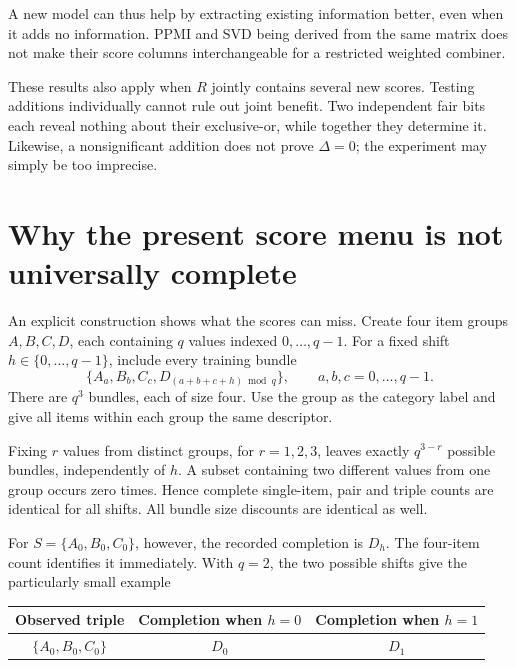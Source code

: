 \documentclass[11pt,a4paper]{article}
\begin{document}
A new model can thus help by extracting existing information better, even
when it adds no information. PPMI and SVD being derived from the same
matrix does not make their score columns interchangeable for a restricted
weighted combiner.

These results also apply when $R$ jointly contains several new scores.
Testing additions individually cannot rule out joint benefit. Two independent
fair bits each reveal nothing about their exclusive-or, while together they
determine it. Likewise, a nonsignificant addition does not prove
$\Delta=0$; the experiment may simply be too imprecise.

\section{Why the present score menu is not universally complete}
\label{sec:counterexample}

An explicit construction shows what the scores can miss. Create four item
groups $A,B,C,D$, each containing $q$ values indexed $0,\ldots,q-1$. For
a fixed shift $h\in\{0,\ldots,q-1\}$, include every training bundle
\begin{equation}
 \{A_a,B_b,C_c,D_{(a+b+c+h)\bmod q}\},
 \qquad a,b,c=0,\ldots,q-1.
 \label{eq:corpus}
\end{equation}
There are $q^3$ bundles, each of size four. Use the group as the category
label and give all items within each group the same descriptor.

Fixing $r$ values from distinct groups, for $r=1,2,3$, leaves exactly
$q^{3-r}$ possible bundles, independently of $h$. A subset containing two
different values from one group occurs zero times. Hence complete
single-item, pair and triple counts are identical for all shifts. All bundle
size discounts are identical as well.

For $S=\{A_0,B_0,C_0\}$, however, the recorded completion is $D_h$.
The four-item count identifies it immediately. With $q=2$, the two possible
shifts give the particularly small example
\begin{center}
\begin{tabular}{@{}ccc@{}}
\toprule
Observed triple & Completion when $h=0$ & Completion when $h=1$\\
\midrule
$\{A_0,B_0,C_0\}$ & $D_0$ & $D_1$\\
\bottomrule
\end{tabular}
\end{center}
\end{document}
